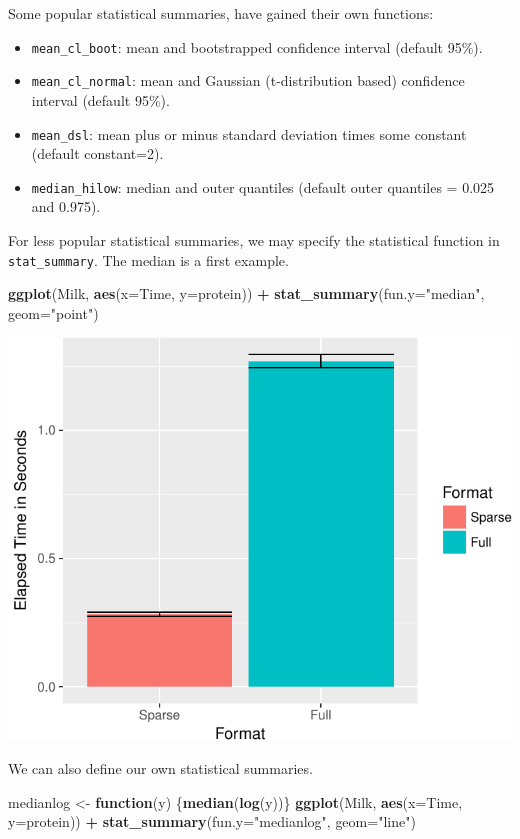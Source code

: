 \documentclass[]{book}
\newenvironment{Shaded}{\begin{snugshade}}{\end{snugshade}}
\newcommand{\ControlFlowTok}[1]{\textcolor[rgb]{0.13,0.29,0.53}{\textbf{#1}}}
\newcommand{\DataTypeTok}[1]{\textcolor[rgb]{0.13,0.29,0.53}{#1}}
\newcommand{\KeywordTok}[1]{\textcolor[rgb]{0.13,0.29,0.53}{\textbf{#1}}}
\newcommand{\NormalTok}[1]{#1}
\newcommand{\OperatorTok}[1]{\textcolor[rgb]{0.81,0.36,0.00}{\textbf{#1}}}
\newcommand{\StringTok}[1]{\textcolor[rgb]{0.31,0.60,0.02}{#1}}
\providecommand{\tightlist}{%
  \setlength{\itemsep}{0pt}\setlength{\parskip}{0pt}}
\theoremstyle{definition}
\theoremstyle{definition}
\theoremstyle{definition}
\theoremstyle{remark}
\begin{document}
Some popular statistical summaries, have gained their own functions:

\begin{itemize}
\tightlist
\item
  \texttt{mean\_cl\_boot}: mean and bootstrapped confidence interval (default 95\%).
\item
  \texttt{mean\_cl\_normal}: mean and Gaussian (t-distribution based) confidence interval (default 95\%).
\item
  \texttt{mean\_dsl}: mean plus or minus standard deviation times some constant (default constant=2).
\item
  \texttt{median\_hilow}: median and outer quantiles (default outer quantiles = 0.025 and 0.975).
\end{itemize}

For less popular statistical summaries, we may specify the statistical function in \texttt{stat\_summary}. The median is a first example.

\begin{Shaded}
\begin{Highlighting}[]
\KeywordTok{ggplot}\NormalTok{(Milk, }\KeywordTok{aes}\NormalTok{(}\DataTypeTok{x=}\NormalTok{Time, }\DataTypeTok{y=}\NormalTok{protein)) }\OperatorTok{+}
\StringTok{  }\KeywordTok{stat_summary}\NormalTok{(}\DataTypeTok{fun.y=}\StringTok{"median"}\NormalTok{, }\DataTypeTok{geom=}\StringTok{"point"}\NormalTok{)}
\end{Highlighting}
\end{Shaded}

\includegraphics[width=0.5\linewidth]{Rcourse_files/figure-latex/unnamed-chunk-283-1}

We can also define our own statistical summaries.

\begin{Shaded}
\begin{Highlighting}[]
\NormalTok{medianlog <-}\StringTok{ }\ControlFlowTok{function}\NormalTok{(y) \{}\KeywordTok{median}\NormalTok{(}\KeywordTok{log}\NormalTok{(y))\}}
\KeywordTok{ggplot}\NormalTok{(Milk, }\KeywordTok{aes}\NormalTok{(}\DataTypeTok{x=}\NormalTok{Time, }\DataTypeTok{y=}\NormalTok{protein)) }\OperatorTok{+}
\StringTok{  }\KeywordTok{stat_summary}\NormalTok{(}\DataTypeTok{fun.y=}\StringTok{"medianlog"}\NormalTok{, }\DataTypeTok{geom=}\StringTok{"line"}\NormalTok{)}
\end{Highlighting}
\end{Shaded}
\end{document}
